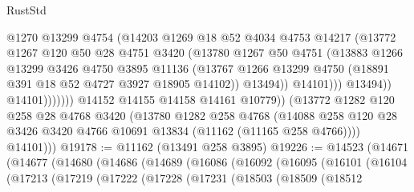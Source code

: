 \begin{lexlean}{RustStd}
\begin{coremodule}
                                @1270
                                @13299
                                @4754
                                (@14203
                                  @1269
                                  @18
                                  @52
                                  @4034
                                  @4753
                                  @14217
                                  (@13772
                                    @1267
                                    @120
                                    @50
                                    @28
                                    @4751
                                    @3420
                                    (@13780
                                      @1267
                                      @50
                                      @4751
                                      (@13883
                                        @1266
                                        @13299
                                        @3426
                                        @4750
                                        @3895
                                        @11136
                                        (@13767
                                          @1266
                                          @13299
                                          @4750
                                          (@18891 @391 @18 @52 @4727 @3927 @18905 @14102))
                                        @13494))
                                    @14101)))
                              @13494))
                          @14101)))))))
            @14152
            @14155
            @14158
            @14161
            @10779))
        (@13772
          @1282
          @120
          @258
          @28
          @4768
          @3420
          (@13780
            @1282
            @258
            @4768
            (@14088 @258 @120 @28 @3426 @3420 @4766 @10691 @13834 (@11162 (@11165 @258 @4766))))
          @14101)))
@19178 := @11162 (@13491 @258 @3895)
@19226 := @14523
    (@14671
      (@14677
        (@14680
          (@14686
            (@14689
              (@16086
                (@16092
                  (@16095
                    (@16101
                      (@16104
                        (@17213
                          (@17219
                            (@17222
                              (@17228
                                (@17231
                                  (@18503
                                    (@18509
                                      (@18512

\end{coremodule}
\end{lexlean}
